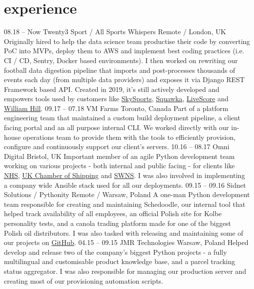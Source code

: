 \documentclass[]{cv-style}  %
\begin{document}
\section{experience}
  \vspace{-0.3cm}

\begin{entrylist}
\entry
  {08.18 -- Now}
  {Twenty3 Sport / All Sports Whispers}
  {Remote / London, UK}
  {Originally hired to help the data science team productise their code by converting PoC into MVPs, deploy them to AWS and implement best coding practices (i.e. CI / CD, Sentry, Docker based environments). I then worked on rewriting our football data digestion pipeline that imports and post-processes thousands of events each day (from multiple data providers) and exposes it via Django REST Framework based API. Created in 2019, it's still actively developed and empowers tools used by customers like \href{https://www.skysports.com/}{SkySports}, \href{https://www.squawka.com/}{Squawka}, \href{https://www.livescore.com/}{LiveScore} and \href{https://www.williamhill.com/}{William Hill}.}
\entry
  {09.17 -- 07.18}
  {VM Farms}
  {Toronto, Canada}
  {Part of a platform engineering team that maintained a custom build deployment pipeline, a client facing portal and an all purpose internal CLI. We worked directly with our in-house operations team to provide them with the tools to efficiently provision, configure and continuously support our client's servers.}
\entry
  {10.16 -- 08.17}
  {Omni Digital}
  {Bristol, UK}
  {Important member of an agile Python development team working on various projects - both internal and public facing - for clients like \href{https://www.bristolccg.nhs.uk/}{NHS}, \href{https://www.ukchamberofshipping.com/}{UK Chamber of Shipping} and \href{http://swns.com/}{SWNS}. I was also involved in implementing a company wide Ansible stack used for all our deployments.}
\entry
  {09.15 -- 09.16}
  {Sidnet Solutions / Pythonity}
  {Remote / Warsaw, Poland}
  {A one-man Python development team responsible for creating and maintaining Schedoodle, our internal tool that helped track availability of all employees, an official Polish site for Kolbe personality tests, and a canola trading platform made for one of the biggest Polish oil distributors. I was also tasked with releasing and maintaining some of our projects on \href{https://github.com/Pythonity}{GitHub}.}
\entry
  {04.15 -- 09.15}
  {JMR Technologies}
  {Warsaw, Poland}
  {Helped develop and release two of the company's biggest Python projects - a fully multilingual and customisable product knowledge base, and a parcel tracking status aggregator. I was also responsible for managing our production server and creating most of our provisioning automation scripts.}
\end{entrylist}
\end{document}

